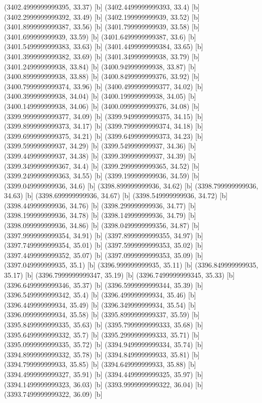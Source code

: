 {{{(3402.4999999999395, 33.37) [b] 
(3402.4499999999393, 33.4) [b] 
(3402.2999999999392, 33.49) [b] 
(3402.199999999939, 33.52) [b] 
(3401.8999999999387, 33.56) [b] 
(3401.799999999939, 33.58) [b] 
(3401.699999999939, 33.59) [b] 
(3401.6499999999387, 33.6) [b] 
(3401.5499999999383, 33.63) [b] 
(3401.4499999999384, 33.65) [b] 
(3401.3999999999382, 33.69) [b] 
(3401.349999999938, 33.79) [b] 
(3401.249999999938, 33.84) [b] 
(3400.949999999938, 33.87) [b] 
(3400.899999999938, 33.88) [b] 
(3400.8499999999376, 33.92) [b] 
(3400.7999999999374, 33.96) [b] 
(3400.4999999999377, 34.02) [b] 
(3400.399999999938, 34.04) [b] 
(3400.199999999938, 34.05) [b] 
(3400.149999999938, 34.06) [b] 
(3400.0999999999376, 34.08) [b] 
(3399.9999999999377, 34.09) [b] 
(3399.9499999999375, 34.15) [b] 
(3399.8999999999373, 34.17) [b] 
(3399.7999999999374, 34.18) [b] 
(3399.6999999999375, 34.21) [b] 
(3399.6499999999373, 34.23) [b] 
(3399.599999999937, 34.29) [b] 
(3399.549999999937, 34.36) [b] 
(3399.449999999937, 34.38) [b] 
(3399.399999999937, 34.39) [b] 
(3399.3499999999367, 34.4) [b] 
(3399.2999999999365, 34.52) [b] 
(3399.2499999999363, 34.55) [b] 
(3399.199999999936, 34.59) [b] 
(3399.049999999936, 34.6) [b] 
(3398.899999999936, 34.62) [b] 
(3398.799999999936, 34.63) [b] 
(3398.699999999936, 34.67) [b] 
(3398.549999999936, 34.72) [b] 
(3398.449999999936, 34.76) [b] 
(3398.299999999936, 34.77) [b] 
(3398.199999999936, 34.78) [b] 
(3398.149999999936, 34.79) [b] 
(3398.099999999936, 34.86) [b] 
(3398.0499999999356, 34.87) [b] 
(3397.9999999999354, 34.91) [b] 
(3397.8999999999355, 34.97) [b] 
(3397.7499999999354, 35.01) [b] 
(3397.5999999999353, 35.02) [b] 
(3397.4499999999352, 35.07) [b] 
(3397.0999999999353, 35.09) [b] 
(3397.049999999935, 35.1) [b] 
(3396.999999999935, 35.11) [b] 
(3396.849999999935, 35.17) [b] 
(3396.7999999999347, 35.19) [b] 
(3396.7499999999345, 35.33) [b] 
(3396.6499999999346, 35.37) [b] 
(3396.5999999999344, 35.39) [b] 
(3396.5499999999342, 35.4) [b] 
(3396.499999999934, 35.46) [b] 
(3396.449999999934, 35.49) [b] 
(3396.349999999934, 35.54) [b] 
(3396.099999999934, 35.58) [b] 
(3395.8999999999337, 35.59) [b] 
(3395.8499999999335, 35.63) [b] 
(3395.7999999999333, 35.68) [b] 
(3395.6499999999332, 35.7) [b] 
(3395.2999999999333, 35.71) [b] 
(3395.0999999999335, 35.72) [b] 
(3394.9499999999334, 35.74) [b] 
(3394.8999999999332, 35.78) [b] 
(3394.849999999933, 35.81) [b] 
(3394.799999999933, 35.85) [b] 
(3394.649999999933, 35.88) [b] 
(3394.4999999999327, 35.91) [b] 
(3394.4499999999325, 35.97) [b] 
(3394.1499999999323, 36.03) [b] 
(3393.9999999999322, 36.04) [b] 
(3393.7499999999322, 36.09) [b] 
}}}
